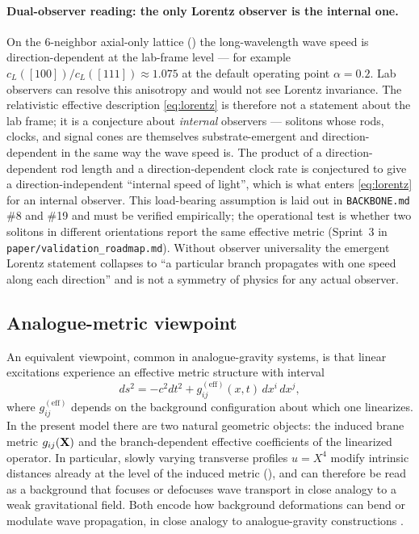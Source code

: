 \paragraph{Dual-observer reading: the only Lorentz observer is the internal one.}
On the 6-neighbor axial-only lattice () the long-wavelength wave speed
is direction-dependent at the lab-frame level — for example $c_L([100])/c_L([111])\approx 1.075$
at the default operating point $\alpha=0.2$.
Lab observers can resolve this anisotropy and would not see Lorentz invariance.
The relativistic effective description \eqref{eq:lorentz} is therefore not a statement about the lab frame; it is a
conjecture about \emph{internal} observers — solitons whose rods, clocks, and signal cones are themselves
substrate-emergent and direction-dependent in the same way the wave speed is.
The product of a direction-dependent rod length and a direction-dependent clock rate is conjectured to give a
direction-independent ``internal speed of light'', which is what enters \eqref{eq:lorentz} for an internal observer.
This load-bearing assumption is laid out in \texttt{BACKBONE.md} \#8 and \#19 and must be verified empirically;
the operational test is whether two solitons in different orientations report the same effective metric
(Sprint~3 in \texttt{paper/validation\_roadmap.md}).
Without observer universality the emergent Lorentz statement collapses to ``a particular branch
propagates with one speed along each direction'' and is not a symmetry of physics for any actual observer.

\subsection{Analogue-metric viewpoint}

An equivalent viewpoint, common in analogue-gravity systems, is that linear excitations experience an
effective metric structure with interval
\begin{equation}
  ds^2 = -c^2 dt^2 + g^{(\text{eff})}_{ij}(x,t)\,dx^i\,dx^j,
  \label{eq:effective-metric-interval}
\end{equation}
where $g^{(\text{eff})}_{ij}$ depends on the background configuration about which one linearizes.
In the present model there are two natural geometric objects: the induced brane metric $g_{ij}(\mathbf{X})$
and the branch-dependent effective coefficients of the linearized operator.
In particular, slowly varying transverse profiles $u=X^4$ modify intrinsic distances already at the level of the induced metric (), and can therefore be read as a background that focuses or defocuses wave transport in close analogy to a weak gravitational field.
Both encode how background deformations can bend or modulate wave propagation, in close analogy to
analogue-gravity constructions \citep{Barcelo2011AnalogueGravity,Volovik2003HeliumDroplet}.

